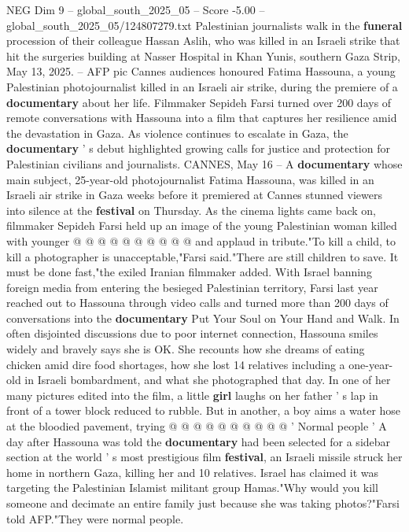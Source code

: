\begin{textsample}{NEG Dim 9 – global\_south\_2025\_05 – Score -5.00 – global\_south\_2025\_05/124807279.txt}  \label{ex:f9_neg_226}
Palestinian journalists walk in the \textbf{funeral} procession of their colleague Hassan Aslih, who was killed in an Israeli strike that hit the surgeries building at Nasser Hospital in Khan Yunis, southern Gaza Strip, May 13, 2025. -- AFP pic Cannes audiences honoured Fatima Hassouna, a young Palestinian photojournalist killed in an Israeli air strike, during the premiere of a \textbf{documentary} about her life.
Filmmaker Sepideh Farsi turned over 200 days of remote conversations with Hassouna into a film that captures her resilience amid the devastation in Gaza.
As violence continues to escalate in Gaza, the \textbf{documentary} ' s debut highlighted growing calls for justice and protection for Palestinian civilians and journalists.
CANNES, May 16 -- A \textbf{documentary} whose main subject, 25-year-old photojournalist Fatima Hassouna, was killed in an Israeli air strike in Gaza weeks before it premiered at Cannes stunned viewers into silence at the \textbf{festival} on Thursday.
As the cinema lights came back on, filmmaker Sepideh Farsi held up an image of the young Palestinian woman killed with younger @ @ @ @ @ @ @ @ @ @ and applaud in tribute."To kill a child, to kill a photographer is unacceptable,"Farsi said."There are still children to save.
It must be done fast,"the exiled Iranian filmmaker added.
With Israel banning foreign media from entering the besieged Palestinian territory, Farsi last year reached out to Hassouna through video calls and turned more than 200 days of conversations into the \textbf{documentary} Put Your Soul on Your Hand and Walk.
In often disjointed discussions due to poor internet connection, Hassouna smiles widely and bravely says she is OK.
She recounts how she dreams of eating chicken amid dire food shortages, how she lost 14 relatives including a one-year-old in Israeli bombardment, and what she photographed that day.
In one of her many pictures edited into the film, a little \textbf{girl} laughs on her father ' s lap in front of a tower block reduced to rubble.
But in another, a boy aims a water hose at the bloodied pavement, trying @ @ @ @ @ @ @ @ @ @ ' Normal people ' A day after Hassouna was told the \textbf{documentary} had been selected for a sidebar section at the world ' s most prestigious film \textbf{festival}, an Israeli missile struck her home in northern Gaza, killing her and 10 relatives.
Israel has claimed it was targeting the Palestinian Islamist militant group Hamas."Why would you kill someone and decimate an entire family just because she was taking photos?"Farsi told AFP."They were normal people.

\end{textsample}
